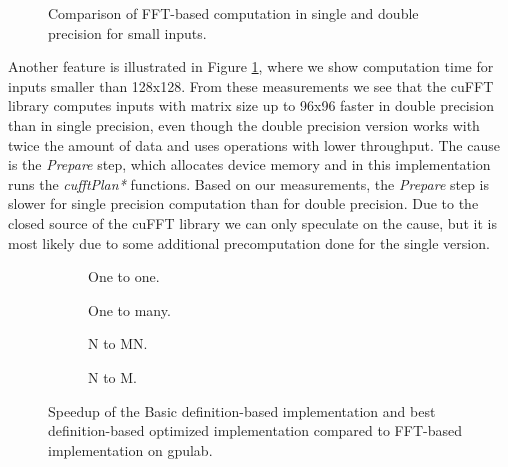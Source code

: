 \begin{figure}[ht]
	\centering
	\def\svgwidth{0.3\textwidth}
	
	\caption{Comparison of FFT-based computation in single and double precision for small inputs.}
	\label{fig:fft_double_faster_compute_time}
\end{figure}

Another feature is illustrated in Figure \ref{fig:fft_double_faster_compute_time}, where we show computation time for inputs smaller than 128x128. From these measurements we see that the cuFFT library computes inputs with matrix size up to 96x96 faster in double precision than in single precision, even though the  double precision version works with twice the amount of data and uses operations with lower throughput. The cause is the \textit{Prepare} step, which allocates device memory and in this implementation runs the \textit{cufftPlan*} functions. Based on our measurements, the \textit{Prepare} step is slower for single precision computation than for double precision. Due to the closed source of the cuFFT library we can only speculate on the cause, but it is most likely due to some additional precomputation done for the single version. 


\begin{figure}[ht]
	\centering	
	\begin{subfigure}{0.4\textwidth}
		\centering
		\def\svgwidth{\textwidth}
		
		\caption{One to one.}
		\label{fig:fft_speedup_one_to_one}
	\end{subfigure}
	\begin{subfigure}{0.4\textwidth}
		\centering
		\def\svgwidth{\textwidth}
		
		\caption{One to many.}
		\label{fig:fft_speedup_one_to_many}
	\end{subfigure}
	\begin{subfigure}{0.4\textwidth}
		\centering
		\def\svgwidth{\textwidth}
		
		\caption{N to MN.}
		\label{fig:fft_speedup_n_to_mn}
	\end{subfigure}
	\begin{subfigure}{0.4\textwidth}
		\centering
		\def\svgwidth{\textwidth}
		
		\caption{N to M.}
		\label{fig:fft_speedup_n_to_m}
	\end{subfigure}
	\caption{Speedup of the Basic definition-based implementation and best definition-based optimized implementation compared to FFT-based implementation on gpulab.}
	\label{fig:fft_speedup}
\end{figure}

